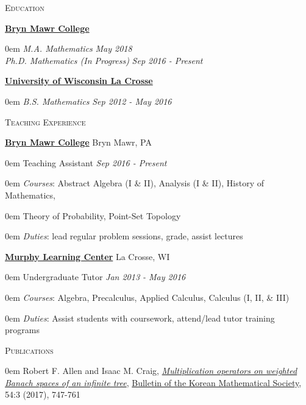 \documentclass[11pt]{article}
\newenvironment{headitem}[2]{\vskip5pt \hspace{.5em} \textbf{#1} \hfill #2 \begin{addmargin}[0em]{0em}}{\end{addmargin}}
\renewenvironment{section}[1]{\textsc{\large #1}}{\vskip10pt}
\newcommand{\itemreg}[1]{\begin{addmargin}[.75em]{0em} #1 \end{addmargin}}
\newcommand{\itemdate}[2]{\hspace{.5em} #1 \hfill \textit{#2} \\}
\newcommand{\itemitdate}[2]{\hspace{.5em} \textit{#1} \hfill \textit{#2} \\}
\begin{document}
\null
\vskip20pt



\begin{section}{Education}

	\begin{headitem}{\href{https://www.brynmawr.edu/math/}{Bryn Mawr College}}{}
		\itemitdate{M.A. Mathematics}{May 2018}
		\itemitdate{Ph.D. Mathematics (In Progress)}{Sep 2016 - Present}
	\end{headitem}
	
	\begin{headitem}{\href{https://www.uwlax.edu/mathematics/}{University of Wisconsin La Crosse}}{}
		\itemitdate{B.S. Mathematics}{Sep 2012 - May 2016}
	\end{headitem}
	
\end{section}



\begin{section}{Teaching Experience}
	
	\begin{headitem}{\href{https://www.brynmawr.edu/math/}{Bryn Mawr College}}{Bryn Mawr, PA}
		\itemdate{Teaching Assistant}{Sep 2016 - Present}
		\itemreg{\textit{Courses}: Abstract Algebra (I \& II), Analysis (I \& II), History of Mathematics,}
		\itemreg{\hskip5pt Theory of Probability, Point-Set Topology}
		\itemreg{\textit{Duties}: lead regular problem sessions, grade, assist lectures}
	\end{headitem}
	
	\begin{headitem}{\href{https://www.uwlax.edu/murphy-learning-center/}{Murphy Learning Center}}{La Crosse, WI}
		\itemdate{Undergraduate Tutor}{Jan 2013 - May 2016}
		\itemreg{\textit{Courses}: Algebra, Precalculus, Applied Calculus, Calculus (I, II, \& III)}
		\itemreg{\textit{Duties}: Assist students with coursework, attend/lead tutor training programs}
	\end{headitem}

\end{section}



\begin{section}{Publications}\vskip5pt
	\itemreg{Robert F. Allen and Isaac M. Craig, \textit{\href{http://bkms.kms.or.kr/journal/view.html?multi\%5B\%5D=7656\&tops=\&book=BKMS\&start=0\&scale=50\&authkey=\&keykey=\&key_1=\&titlekey=\&tit_1=\&abskey=\&abs_1=\&msckey=\&msc_1=\&Vol=54\&Num=3\&PG=\&year1=\&year2=\&sort=Regnum-0\&aut_box=Y\&sub_box=Y\&sos_box=\&key_box=\&pub_box=Y\&abs_box=\&mod=vol\&sflag=\&language=\&uid=}{Multiplication operators on weighted Banach spaces of an infinite tree}}, \href{http://bkms.kms.or.kr/}{Bulletin of the Korean Mathematical Society}, 54:3 (2017), 747-761}
\end{section}
\end{document}
